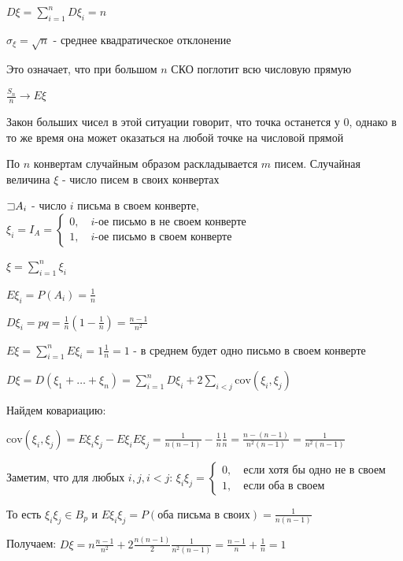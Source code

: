 \documentclass[12pt]{article}
\begin{document}
    $D\xi = \sum_{i = 1}^n D\xi_i = n$

    $\sigma_\xi = \sqrt{n}$ - среднее квадратическое отклонение

    Это означает, что при большом $n$ СКО поглотит всю числовую прямую

    $\frac{S_n}{n} \to E\xi$

    Закон больших чисел в этой ситуации говорит, что точка останется у 0, однако в то же время она может оказаться на любой точке на числовой прямой

    \Ex По $n$ конвертам случайным образом раскладывается $m$ писем. Случайная величина $\xi$ - число писем в своих конвертах

    $\mathord{\sqsupset} A_i$ - число $i$ письма в своем конверте, $\xi_i = I_A = \begin{cases}0, \quad i\text{-ое письмо в не своем конверте} \\ 1, \quad i\text{-ое письмо в своем конверте} \end{cases}$

    $\xi = \sum_{i = 1}^n \xi_i$

    $E\xi_i = P(A_i) = \frac{1}{n}$

    $D\xi_i = pq = \frac{1}{n} (1 - \frac{1}{n}) = \frac{n - 1}{n^2}$

    $E\xi = \sum_{i = 1}^n E\xi_i = 1 \frac{1}{n} = 1$ - в среднем будет одно письмо в своем конверте

    $D\xi = D(\xi_1 + \dots + \xi_n) = \sum_{i = 1}^n D\xi_i + 2\sum_{i < j} \mathrm{cov} (\xi_i, \xi_j)$

    Найдем ковариацию:

    $\mathrm{cov}(\xi_i, \xi_j) = E\xi_i \xi_j - E\xi_i E\xi_j = \frac{1}{n(n - 1)} - \frac{1}{n}\frac{1}{n} = \frac{n - (n - 1)}{n^2(n - 1)} = \frac{1}{n^2(n - 1)}$

    Заметим, что для любых $i, j, i < j$: $\xi_i \xi_j = \begin{cases}0, \quad \text{если хотя бы одно не в своем} \\ 1, \quad \text{если оба в своем}\end{cases}$
    
    То есть $\xi_i\xi_j \in B_p$ и $E\xi_i \xi_j = P(\text{оба письма в своих}) = \frac{1}{n(n - 1)}$

    Получаем: $D\xi = n \frac{n - 1}{n^2} + 2\frac{n(n - 1)}{2}\frac{1}{n^2(n - 1)} = \frac{n - 1}{n} + \frac{1}{n} = 1$

    



    
\end{document}
